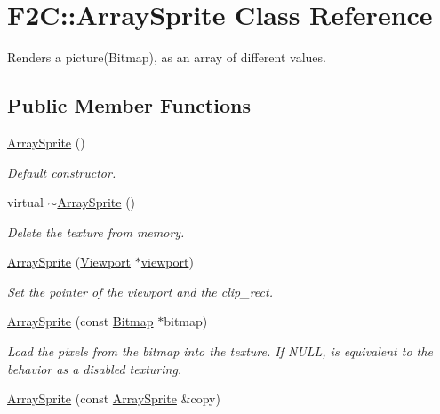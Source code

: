 \hypertarget{class_f2_c_1_1_array_sprite}{
\section{F2C::ArraySprite Class Reference}
\label{class_f2_c_1_1_array_sprite}
}


Renders a picture(Bitmap), as an array of different values.  
\subsection*{Public Member Functions}
\begin{DoxyCompactItemize}
\item 
\hypertarget{class_f2_c_1_1_array_sprite_a084edc3ab72ab882178673283e2ebb91}{
\hyperlink{class_f2_c_1_1_array_sprite_a084edc3ab72ab882178673283e2ebb91}{ArraySprite} ()}
\label{class_f2_c_1_1_array_sprite_a084edc3ab72ab882178673283e2ebb91}

\begin{DoxyCompactList}\small\item\em Default constructor. \item\end{DoxyCompactList}\item 
\hypertarget{class_f2_c_1_1_array_sprite_ae0dbb28d0a85e7de503d704fd22c0451}{
virtual \hyperlink{class_f2_c_1_1_array_sprite_ae0dbb28d0a85e7de503d704fd22c0451}{$\sim$ArraySprite} ()}
\label{class_f2_c_1_1_array_sprite_ae0dbb28d0a85e7de503d704fd22c0451}

\begin{DoxyCompactList}\small\item\em Delete the texture from memory. \item\end{DoxyCompactList}\item 
\hyperlink{class_f2_c_1_1_array_sprite_a412ffea7593257bb399c109e9f0662f2}{ArraySprite} (\hyperlink{class_f2_c_1_1_viewport}{Viewport} $\ast$\hyperlink{class_f2_c_1_1_array_sprite_acbf1252a3782ba0a09c14b0b52fd48b8}{viewport})
\begin{DoxyCompactList}\small\item\em Set the pointer of the viewport and the clip\_\-rect. \item\end{DoxyCompactList}\item 
\hyperlink{class_f2_c_1_1_array_sprite_a2caa4bd4c8ca99dab916ddb6b9d12666}{ArraySprite} (const \hyperlink{class_f2_c_1_1_bitmap}{Bitmap} $\ast$bitmap)
\begin{DoxyCompactList}\small\item\em Load the pixels from the bitmap into the texture. If NULL, is equivalent to the behavior as a disabled texturing. \item\end{DoxyCompactList}\item 
\hypertarget{class_f2_c_1_1_array_sprite_a6a647fab4e8b1ea85911f339085a3ac2}{
\hyperlink{class_f2_c_1_1_array_sprite_a6a647fab4e8b1ea85911f339085a3ac2}{ArraySprite} (const \hyperlink{class_f2_c_1_1_array_sprite}{ArraySprite} \&copy)}
\label{class_f2_c_1_1_array_sprite_a6a647fab4e8b1ea85911f339085a3ac2}


\end{DoxyCompactItemize}
